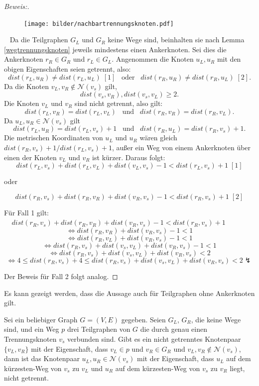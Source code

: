 \begin{proof}[Beweis:]~\newline
\vspace{-4mm}
\begin{figure}[!h]
\centering
\texttt{[image: bilder/nachbartrennungsknoten.pdf]}
\end{figure}
~\linebreak
Da die Teilgraphen $G_L$ und $G_R$ keine Wege sind, beinhalten sie nach Lemma \ref{wegtrennungsknoten} jeweils mindestens einen Ankerknoten. Sei dies die Ankerknoten $r_R \in G_R$ und $r_L \in G_L$. Angenommen die Knoten $u_L,u_R$ mit den obigen Eigenschaften seien getrennt, also: $$dist(r_L,u_R)\neq dist(r_L,u_L)\; [1]\;\;\; \text{oder}\;\;\; dist(r_R,u_R)\neq dist(r_R,u_L)\; [2].$$
  Da die Knoten $v_L, v_R \notin \mathcal{N}(v_s)$ gilt, $$dist(v_s,v_R),dist(v_s,v_L)\geq 2.$$ Die Knoten $v_L$ und $v_R$ sind nicht getrennt, also gilt: $$dist(r_L,v_R)=dist(r_L,v_L)\;\;\; \text{und}\;\;\; dist(r_R,v_R)=dist(r_R,v_L).$$ Da $u_L,u_R \in \mathcal{N}(v_s)$ gilt $$dist(r_L,u_R)=dist(r_L,v_s)+1\;\;\; \text{und}\;\;\;dist(r_R,u_L)=dist(r_R,v_s)+1.$$   
Die metrischen Koordinaten von $u_L$ und $u_R$ wären gleich $dist(r_R,v_s)+1/dist(r_L,v_s)+1$, außer ein Weg von einem Ankerknoten über einen der Knoten $v_L$ und $v_R$ ist kürzer. Daraus folgt: $$dist(r_L,v_s)+dist(r_L,v_L)+dist(v_L,v_s)-1< dist(r_L,v_s)+1\;[1]$$ \begin{center} oder  \end{center}
$$dist(r_R,v_s)+dist(r_R,v_R)+dist(v_R,v_s)-1< dist(r_R,v_s)+1\;[2]$$ 

Für Fall 1 gilt: $\;\;\;\;dist(r_R,v_s)+dist(r_R,v_R)+dist(v_R,v_s)-1< dist(r_R,v_s)+1$ 
  $$\Leftrightarrow dist(r_R,v_R)+dist(v_R,v_s)-1< 1$$ $$\Leftrightarrow dist(r_R,v_L)+dist(v_R,v_s)-1< 1$$
  $$\Leftrightarrow dist(r_R,v_s)+ dist(v_s,v_L)+dist(v_R,v_s)-1 < 1$$ $$\Leftrightarrow dist(r_R,v_s)+dist(v_s,v_L)+dist(v_R,v_s)< 2$$
  $$\Leftrightarrow  4 \leq dist(r_R,v_s) +4 \leq dist(r_R,v_s)+dist(v_s,v_L)+dist(v_R,v_s)< 2 \lightning$$

Der Beweis für Fall 2 folgt analog. 
  \end{proof}
Es kann gezeigt werden, dass die Aussage auch für Teilgraphen ohne Ankerknoten gilt.
\begin{lem}
\label{nachbartrennungsknoten2}
Sei ein beliebiger Graph $G=(V,E)$ gegeben. Seien $G_L$, $G_R$, die keine Wege sind, und ein Weg $p$ drei Teilgraphen von $G$ die durch genau einen Trennungsknoten $v_s$ verbunden sind. Gibt es ein nicht getrenntes Knotenpaar $\{v_L,v_R\}$ mit der Eigenschaft, dass $v_L\in p$ und $v_R \in G_R$ und $v_L, v_R \notin \mathcal{N}(v_s)$, dann ist das Knotenpaar $u_L,u_R \in \mathcal{N}(v_s)$ mit der Eigenschaft, dass $u_L$ auf dem kürzesten-Weg von $v_s$ zu $v_L$ und $u_R$ auf dem kürzesten-Weg von $v_s$ zu $v_R$ liegt, nicht getrennt.
\end{lem}
